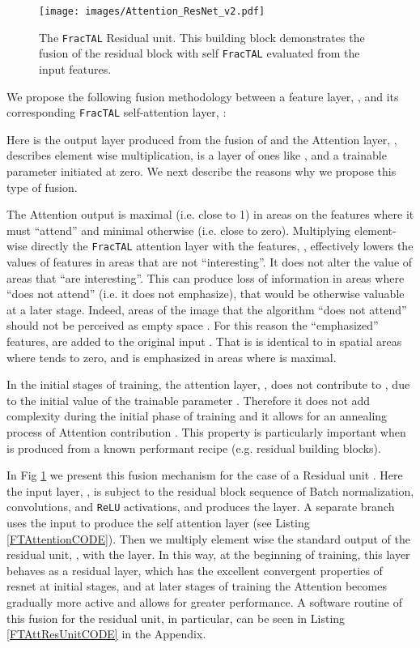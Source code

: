 \documentclass[times, 5p]{elsarticle}
\def \FracTAL {\texttt{FracTAL} }
\begin{document}
\begin{figure}
\centering
\texttt{[image: images/Attention\_ResNet\_v2.pdf]}
\caption{The \FracTAL Residual unit. This  building block demonstrates  the fusion of the residual block with self \FracTAL evaluated from the input features.}
\label{ResNetFusion}
\end{figure}
  

We propose the following fusion methodology between a feature layer, , and its corresponding \FracTAL  self-attention layer, :

Here  is the output layer produced from the fusion of  and the Attention layer, ,  describes element wise multiplication,  is a layer of ones like , and  a trainable parameter initiated at zero. We next describe  the reasons why we propose this type of fusion. 

 The Attention output is maximal (i.e. close to 1) in areas on the features where it must ``attend'' and minimal otherwise (i.e. close to zero). Multiplying element-wise directly the \FracTAL attention layer  with the features, , effectively lowers the values of features in areas that are not ``interesting''. It does not alter the value of areas that ``are interesting''. 
This can produce loss  of information in areas where  ``does not attend'' (i.e. it does not emphasize), that would be otherwise valuable at a later stage. Indeed, areas of the image that the algorithm ``does not attend'' should not be perceived as empty space \citep{TREISMAN198097}. For this reason the ``emphasized'' features,  are added to the original input . That is 
 is identical to  in spatial areas where  tends to zero, and is emphasized in areas where  is maximal. 

 In the initial stages of training, the attention layer, , does not contribute to , due to the initial value of the trainable parameter . Therefore it does not add complexity during  the initial phase of training and it allows for an annealing process of Attention  contribution \citep[][see also \citealt{chen2020dasnet}]{zhang2018selfattention}. This property is particularly important when  is produced from a known performant recipe (e.g. residual building blocks). 

In Fig \ref{ResNetFusion} we present this fusion mechanism for the case of a Residual unit \citep{DBLP:journals/corr/HeZR016,DBLP:journals/corr/HeZRS15}. Here the input layer, , is subject to the residual block sequence of Batch normalization, convolutions, and \texttt{ReLU} activations, and produces the  layer. A separate branch uses the  input to produce the self attention layer  (see Listing \ref{FTAttentionCODE}). Then we multiply element wise the standard output of the residual unit, , with the  layer. In this way, at the beginning of training, this layer behaves as a residual layer, which has the excellent convergent properties of resnet at initial stages, and at later stages of training the Attention becomes gradually more active and allows for greater performance. A software routine of this fusion for the residual unit, in particular, can be seen in Listing \ref{FTAttResUnitCODE} in the Appendix. 
 
\end{document}
